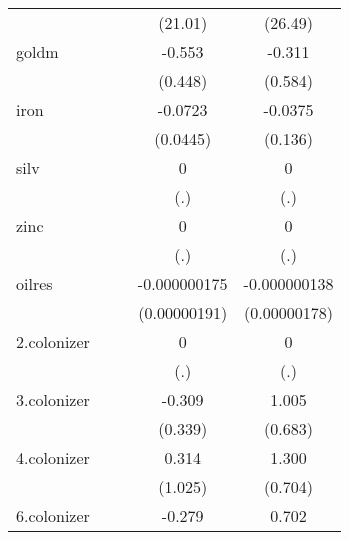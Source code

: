 {\begin{tabular}{l*{4}{c}}
            &                     &                     &     (21.01)         &     (26.49)         \\
[1em]
goldm       &                     &                     &      -0.553         &      -0.311         \\
            &                     &                     &     (0.448)         &     (0.584)         \\
[1em]
iron        &                     &                     &     -0.0723         &     -0.0375         \\
            &                     &                     &    (0.0445)         &     (0.136)         \\
[1em]
silv        &                     &                     &           0         &           0         \\
            &                     &                     &         (.)         &         (.)         \\
[1em]
zinc        &                     &                     &           0         &           0         \\
            &                     &                     &         (.)         &         (.)         \\
[1em]
oilres      &                     &                     &-0.000000175         &-0.000000138         \\
            &                     &                     &(0.00000191)         &(0.00000178)         \\
[1em]
2.colonizer &                     &                     &           0         &           0         \\
            &                     &                     &         (.)         &         (.)         \\
[1em]
3.colonizer &                     &                     &      -0.309         &       1.005         \\
            &                     &                     &     (0.339)         &     (0.683)         \\
[1em]
4.colonizer &                     &                     &       0.314         &       1.300         \\
            &                     &                     &     (1.025)         &     (0.704)         \\
[1em]
6.colonizer &                     &                     &      -0.279         &       0.702         \\

\end{tabular}}
